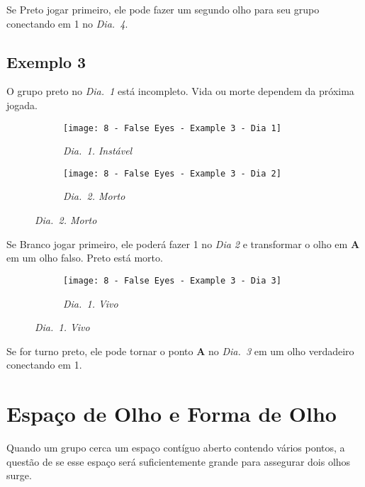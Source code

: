 Se Preto jogar primeiro, ele pode fazer um segundo olho para seu grupo conectando em 1 no \emph{Dia.\@~4}.

\pagebreak

\subsection{Exemplo 3}

O grupo preto no \emph{Dia.\@~1} está incompleto. Vida ou morte dependem da próxima jogada.

\begin{figure}[h!]
    \centering
    \begin{subfigure}[t]{.31\textwidth}
        \texttt{[image: 8 - False Eyes - Example 3 - Dia 1]}
        \captionsetup{justification=centering}
        \caption*{\emph{Dia.\@~1. Instável}}
    \end{subfigure}
    \hspace{1cm}
    \begin{subfigure}[t]{.31\textwidth}
        \texttt{[image: 8 - False Eyes - Example 3 - Dia 2]}
        \captionsetup{justification=centering}
        \caption*{\emph{Dia.\@~2. Morto}}
    \end{subfigure}
\end{figure}

Se Branco jogar primeiro, ele poderá fazer 1 no \emph{Dia 2} e transformar o olho em \textbf{A} em um olho falso. Preto está morto.

\begin{figure}[h!]
    \centering
    \begin{subfigure}[t]{.31\textwidth}
        \texttt{[image: 8 - False Eyes - Example 3 - Dia 3]}
        \captionsetup{justification=centering}
        \caption*{\emph{Dia.\@~1. Vivo}}
    \end{subfigure}
\end{figure}

Se for turno preto, ele pode tornar o ponto \textbf{A} no \emph{Dia.\@~3} em um olho verdadeiro conectando em 1. 

\pagebreak

\section{Espaço de Olho e Forma de Olho}

Quando um grupo cerca um espaço contíguo aberto contendo vários pontos, a questão de se esse espaço será suficientemente grande para assegurar dois olhos surge.

